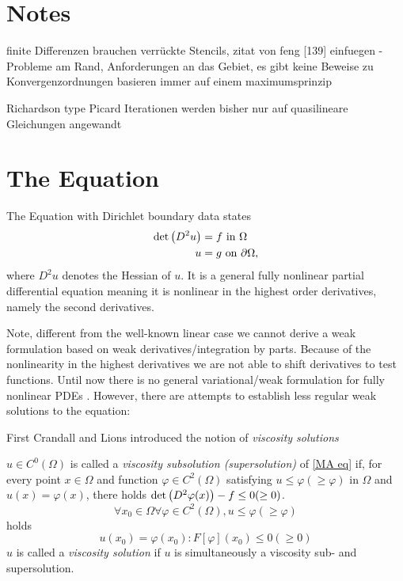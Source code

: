\section{Notes}
finite Differenzen brauchen verrückte Stencils, zitat von feng [139] einfuegen - Probleme am Rand, Anforderungen an das Gebiet, es gibt keine Beweise zu Konvergenzordnungen
basieren immer auf einem maximumsprinzip

Richardson type Picard Iterationen werden bisher nur auf quasilineare Gleichungen angewandt



\section{The \MA Equation}

The \MA Equation with Dirichlet boundary data states
\begin{align}
	 \det{\left(D^2 u\right)} &= f \textnormal{ in } \Omega \label{MA eq}\\
	 u & = g \textnormal{ on } \partial \Omega,
\end{align}
where $D^2 u$ denotes the Hessian of $u$.
It is a general fully nonlinear partial differential equation meaning it is nonlinear in the highest order derivatives, namely the second derivatives.

Note, different from the well-known linear case we cannot derive a weak formulation based on weak derivatives/integration by parts. Because of the nonlinearity in the highest derivatives we are not able to shift derivatives to test functions. Until now there is no general variational/weak formulation for fully nonlinear PDEs \cite{FGN2013}.
However, there are attempts to establish less regular weak solutions to the \MA equation:

First Crandall and Lions \cite{58} introduced the notion of \emph{viscosity solutions}
\begin{definition}
	$u \in C^0(\Omega)$ is called a \emph{viscosity subsolution (supersolution)} of \eqref{MA eq} if, for every point $x \in \Omega$ and function $\varphi \in C^2(\Omega)$ satisfying $u \leq \varphi (\geq \varphi)$ in $\Omega$ and $u(x) = \varphi(x)$, there holds $\det{\left(D^2 \varphi(x)\right)} - f \leq 0 (\geq 0)$. 
	\[
	\forall x_0 \in \Omega \forall \varphi \in C^2(\Omega), u \leq \varphi (\geq \varphi)
	\] holds
	\[
	u(x_0) = \varphi(x_0) : F[\varphi](x_0) \leq 0 (\geq 0)
	\]
	$u$ is called a \emph{viscosity solution} if $u$ is simultaneously a viscosity sub- and supersolution.
\end{definition}

